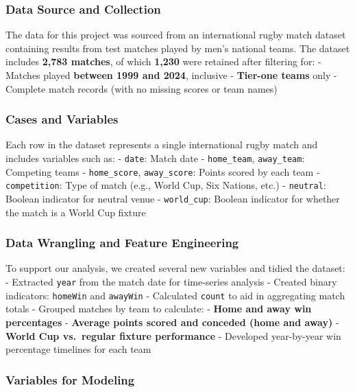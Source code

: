 \documentclass[
  letterpaper,
  DIV=11,
  numbers=noendperiod]{scrartcl}
\begin{document}
\subsubsection{\texorpdfstring{\textbf{Data Source and
Collection}}{Data Source and Collection}}\label{data-source-and-collection}

The data for this project was sourced from an international rugby match
dataset containing results from test matches played by men's national
teams. The dataset includes \textbf{2,783 matches}, of which
\textbf{1,230} were retained after filtering for: - Matches played
\textbf{between 1999 and 2024}, inclusive - \textbf{Tier-one teams} only
- Complete match records (with no missing scores or team names)

\subsubsection{\texorpdfstring{\textbf{Cases and
Variables}}{Cases and Variables}}\label{cases-and-variables}

Each row in the dataset represents a single international rugby match
and includes variables such as: - \texttt{date}: Match date -
\texttt{home\_team}, \texttt{away\_team}: Competing teams -
\texttt{home\_score}, \texttt{away\_score}: Points scored by each team -
\texttt{competition}: Type of match (e.g., World Cup, Six Nations, etc.)
- \texttt{neutral}: Boolean indicator for neutral venue -
\texttt{world\_cup}: Boolean indicator for whether the match is a World
Cup fixture

\subsubsection{\texorpdfstring{\textbf{Data Wrangling and Feature
Engineering}}{Data Wrangling and Feature Engineering}}\label{data-wrangling-and-feature-engineering}

To support our analysis, we created several new variables and tidied the
dataset: - Extracted \texttt{year} from the match date for time-series
analysis - Created binary indicators: \texttt{homeWin} and
\texttt{awayWin} - Calculated \texttt{count} to aid in aggregating match
totals - Grouped matches by team to calculate: - \textbf{Home and away
win percentages} - \textbf{Average points scored and conceded (home and
away)} - \textbf{World Cup vs.~regular fixture performance} - Developed
year-by-year win percentage timelines for each team

\subsubsection{\texorpdfstring{\textbf{Variables for
Modeling}}{Variables for Modeling}}\label{variables-for-modeling}
\end{document}
